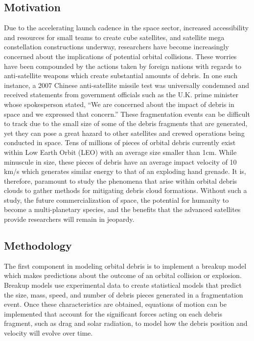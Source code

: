 \documentclass[a4paper, 12pt]{article}
\begin{document}
\subsection{Motivation}
Due to the accelerating launch cadence in the space sector, increased accessibility and resources for small teams to create cube satellites, and satellite mega constellation constructions underway, researchers have become increasingly concerned about the implications of potential orbital collisions. These worries have been compounded by the actions taken by foreign nations with regards to anti-satellite weapons which create substantial amounts of debris. In one such instance, a 2007 Chinese anti-satellite missile test was universally condemned and received statements from government officials such as the U.K. prime minister whose spokesperson stated, ``We are concerned about the impact of debris in space and we expressed that concern.'' These fragmentation events can be difficult to track due to the small size of some of the debris fragments that are generated, yet they can pose a great hazard to other satellites and crewed operations being conducted in space. Tens of millions of pieces of orbital debris currently exist within Low Earth Orbit (LEO) with an average size smaller than 1cm. While minuscule in size, these pieces of debris have an average impact velocity of 10 km/s which generates similar energy to that of an exploding hand grenade. It is, therefore, paramount to study the phenomena that arise within orbital debris clouds to gather methods for mitigating debris cloud formations. Without such a study, the future commercialization of space, the potential for humanity to become a multi-planetary species, and the benefits that the advanced satellites provide researchers will remain in jeopardy.%
\subsection{Methodology}
The first component in modeling orbital debris is to implement a breakup model which makes predictions about the outcome of an orbital collision or explosion. Breakup models use experimental data to create statistical models that predict the size, mass, speed, and number of debris pieces generated in a fragmentation event. Once these characteristics are obtained, equations of motion can be implemented that account for the significant forces acting on each debris fragment, such as drag and solar radiation, to model how the debris position and velocity will evolve over time. 
\end{document}
